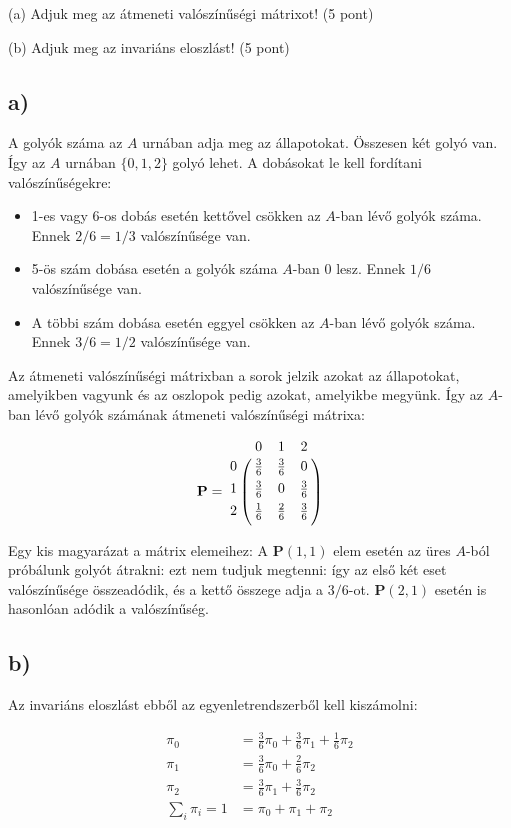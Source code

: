 \documentclass[a4paper,12pt]{article}   		%
\begin{document}
(a) Adjuk meg az átmeneti valószínűségi mátrixot! (5 pont)

(b) Adjuk meg az invariáns eloszlást! (5 pont)

\subsection*{a)}
A golyók száma az $A$ urnában adja meg az állapotokat. Összesen két
golyó van. Így az $A$ urnában $\{0, 1, 2\}$ golyó lehet. A dobásokat le
kell fordítani valószínűségekre:

\begin{itemize}
\item 1-es vagy 6-os dobás esetén kettővel csökken az $A$-ban lévő golyók
száma. Ennek $2/6 = 1/3$ valószínűsége van.
\item 5-ös szám dobása esetén a golyók száma $A$-ban 0 lesz. Ennek 
$1/6$ valószínűsége van.
\item A többi szám dobása esetén eggyel csökken az $A$-ban lévő golyók
száma. Ennek $3/6 = 1/2$ valószínűsége van.
\end{itemize}

Az átmeneti valószínűségi mátrixban a sorok jelzik azokat az állapotokat,
amelyikben vagyunk és az oszlopok pedig azokat, amelyikbe megyünk. Így 
az $A$-ban lévő golyók számának átmeneti valószínűségi mátrixa:

\[
\mathbf{P} = 
\bordermatrix{
~	&	0			&	1			&	2   		\cr \\[0.4em]
0	&	\frac{3}{6}	&	\frac{3}{6}	&	0			\cr \\[0.4em]
1	&	\frac{3}{6}	&	0			&	\frac{3}{6}	\cr \\[0.4em]
2	&	\frac{1}{6}	&	\frac{2}{6}	&	\frac{3}{6}}
\]

Egy kis magyarázat a mátrix elemeihez:
A $\mathbf{P}(1, 1)$ elem esetén az üres $A$-ból próbálunk golyót átrakni: 
ezt nem tudjuk megtenni: így az első két eset valószínűsége összeadódik, és
a kettő összege adja a $3/6$-ot. $\mathbf{P}(2, 1)$ esetén is hasonlóan 
adódik a valószínűség.

\subsection*{b)}
Az invariáns eloszlást ebből az egyenletrendszerből kell kiszámolni:

\begin{align*}
\pi_0 &= \frac{3}{6} \pi_0 + \frac{3}{6}\pi_1 + \frac{1}{6}\pi_2 \\
\pi_1 &= \frac{3}{6} \pi_0 + \frac{2}{6} \pi_2 \\
\pi_2 &= \frac{3}{6} \pi_1 + \frac{3}{6} \pi_2 \\
\sum_{i}\pi_i = 1 &= \pi_0 + \pi_1 + \pi_2
\end{align*}
\end{document}
